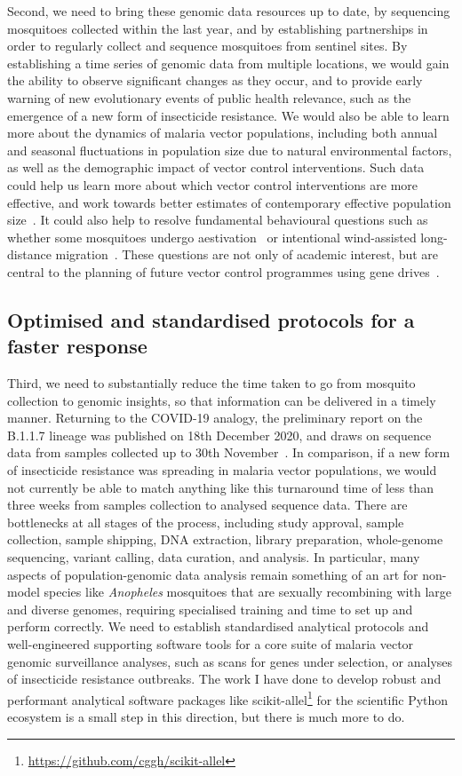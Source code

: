 \documentclass[a4paper,11pt,abstracton,hidelinks]{scrartcl}
\begin{document}
Second, we need to bring these genomic data resources up to date, by sequencing mosquitoes collected within the last year, and by establishing partnerships in order to regularly collect and sequence mosquitoes from sentinel sites.
%
By establishing a time series of genomic data from multiple locations, we would gain the ability to observe significant changes as they occur, and to provide early warning of new evolutionary events of public health relevance, such as the emergence of a new form of insecticide resistance.
%
We would also be able to learn more about the dynamics of malaria vector populations, including both annual and seasonal fluctuations in population size due to natural environmental factors, as well as the demographic impact of vector control interventions.
%
Such data could help us learn more about which vector control interventions are more effective, and work towards better estimates of contemporary effective population size~\parencite{Hui2015}.
%
It could also help to resolve fundamental behavioural questions such as whether some mosquitoes undergo aestivation~\parencite{Dao2014} or intentional wind-assisted long-distance migration~\parencite{Huestis2019}.
%
These questions are not only of academic interest, but are central to the planning of future vector control programmes using gene drives~\parencite{North2019}.


\subsection{Optimised and standardised protocols for a faster response}


Third, we need to substantially reduce the time taken to go from mosquito collection to genomic insights, so that information can be delivered in a timely manner.
%
Returning to the COVID-19 analogy, the preliminary report on the B.1.1.7 lineage was published on 18th December 2020, and draws on sequence data from samples collected up to 30th November~\parencite{Rambaut2020}.
%
In comparison, if a new form of insecticide resistance was spreading in malaria vector populations, we would not currently be able to match anything like this turnaround time of less than three weeks from samples collection to analysed sequence data.
%
There are bottlenecks at all stages of the process, including study approval, sample collection, sample shipping, DNA extraction, library preparation, whole-genome sequencing, variant calling, data curation, and analysis.
%
In particular, many aspects of population-genomic data analysis remain something of an art for non-model species like \textit{Anopheles} mosquitoes that are sexually recombining with large and diverse genomes, requiring specialised training and time to set up and perform correctly.
%
We need to establish standardised analytical protocols and well-engineered supporting software tools for a core suite of malaria vector genomic surveillance analyses, such as scans for genes under selection, or analyses of insecticide resistance outbreaks.
%
The work I have done to develop robust and performant analytical software packages like scikit-allel\footnote{\url{https://github.com/cggh/scikit-allel}} for the scientific Python ecosystem is a small step in this direction, but there is much more to do.
\end{document}
